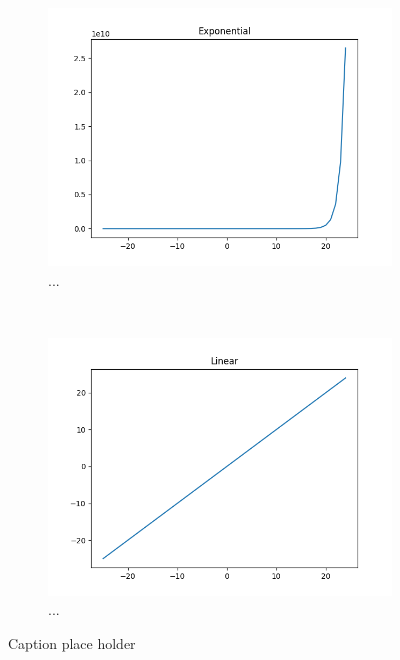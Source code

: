 \begin{figure}[t!]
	\centering
	\begin{subfigure}[t]{0.5\textwidth}
		\centering
		\includegraphics[width=\textwidth]{img/methodology_neuralNetwork_activationFunction_exponential.png}
		\caption{...}
	\end{subfigure}%
	~ 
	\begin{subfigure}[t]{0.5\textwidth}
		\centering
		\includegraphics[width=\textwidth]{img/methodology_neuralNetwork_activationFunction_linear.png}
		\caption{...}
	\end{subfigure}
	\caption{Caption place holder}
\end{figure}
%
